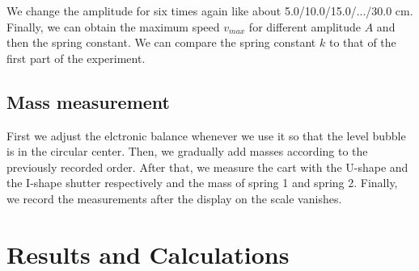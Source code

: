 \documentclass[a4paper]{report}
\begin{document}
	We change the amplitude for six times again like about 5.0/10.0/15.0/.../30.0 cm. Finally, we can obtain the maximum speed $v_{max}$ for different amplitude $A$ and then the spring constant. We can compare the spring constant $k$ to that of the first part of the experiment.
	\subsection{Mass measurement}
	First we adjust the elctronic balance whenever we use it so that the level bubble is in the circular center. Then, we gradually add masses according to the previously recorded order. After that, we measure the cart with the U-shape and the I-shape shutter respectively and the mass of spring 1 and spring 2. Finally, we record the measurements after the display on the scale vanishes.
	\section{Results and Calculations}
\end{document}
